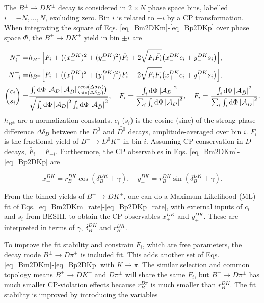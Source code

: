 \documentclass[12pt, a4paper, notitlepage, onecolumn]{article}
\begin{document}
The $B^\pm\to DK^\pm$ decay is considered in $2\times N$ phase space bins, labelled $i = -N, ..., N$, excluding zero. Bin $i$ is related to $-i$ by a CP transformation. When integrating the square of Eqs. \eqref{eq_Bm2DKm}-\eqref{eq_Bp2DKp} over phase space $\Phi$, the $B^\mp\to DK^\mp$ yield in bin $\pm i$ are

\begin{align}
  N^-_i =& h_{B^-}\Big[F_i + \big((x_-^{DK})^2 + (y_-^{DK})^2\big)\bar{F}_i + 2\sqrt{F_i\bar{F}_i}\big(x_-^{DK}c_i + y_-^{DK}s_i\big)\Big], \label{eq_Bm2DKm_rate} \\
  N^+_{-i} =& h_{B^+}\Big[F_i + \big((x_+^{DK})^2 + (y_+^{DK})^2\big)\bar{F}_i + 2\sqrt{F_i\bar{F}_i}\big(x_+^{DK}c_i + y_+^{DK}s_i\big)\Big], \label{eq_Bp2DKp_rate} \\
  {c_i\choose s_i} =& \frac{\int_i\dd{\Phi}\abs{\mathcal{A}_D}\abs{\mathcal{A}_{\bar{D}}}{\cos(\Delta\delta_D)\choose\sin(\Delta\delta_D)}}{\sqrt{\int_i\dd{\Phi}\abs{\mathcal{A}_D}^2\int_i\dd{\Phi}\abs{\mathcal{A}_{\bar{D}}}^2}}, \quad F_i = \frac{\int_i\dd{\Phi}\abs{\mathcal{A}_D}^2}{\sum_i\int_i\dd{\Phi}\abs{\mathcal{A}_D}^2}, \quad \bar{F}_i = \frac{\int_i\dd{\Phi}\abs{\mathcal{A}_{\bar{D}}}^2}{\sum_i\int_i\dd{\Phi}\abs{\mathcal{A}_{\bar{D}}}^2}. \label{eq_hadronic_parameters}
\end{align}
$h_{B^\pm}$ are a normalization constants. $c_i$ ($s_i$) is the cosine (sine) of the strong phase difference $\Delta\delta_D$ between the $D^0$ and $\bar{D^0}$ decays, amplitude-averaged over bin $i$. $F_i$ is the fractional yield of $B^-\to D^0K^-$ in bin $i$. Assuming CP conservation in $D$ decays, $\bar{F}_i = F_{-i}$. Furthermore, the CP observables in Eqs. \eqref{eq_Bm2DKm}-\eqref{eq_Bp2DKp} are

\begin{equation}
  x_\pm^{DK} = r_B^{DK}\cos(\delta_B^{DK}\pm\gamma), \quad  y_\pm^{DK} = r_B^{DK}\sin(\delta_B^{DK}\pm\gamma).
  \label{eq_xy_cp}
\end{equation}

From the binned yields of $B^\pm\to DK^\pm$, one can do a Maximum Likelihood (ML) fit of Eqs. \eqref{eq_Bm2DKm_rate}-\eqref{eq_Bp2DKp_rate}, with external inputs of $c_i$ and $s_i$ from BESIII, to obtain the CP observables $x_\pm^{DK}$ and $y_\pm^{DK}$. These are interpreted in terms of $\gamma$, $\delta_B^{DK}$ and $r_B^{DK}$.

To improve the fit stability and constrain $F_i$, which are free parameters, the decay mode $B^\pm\to D\pi^\pm$ is included fit. This adds another set of Eqs. \eqref{eq_Bm2DKm}-\eqref{eq_Bp2DKp} with $K\to\pi$. The similar selection and common topology means $B^\pm\to DK^\pm$ and $D\pi^\pm$ will share the same $F_i$, but $B^\pm\to D\pi^\pm$ has much smaller CP-violation effects because $r_B^{D\pi}$ is much smaller than $r_B^{DK}$. The fit stability is improved by introducing the variables
\end{document}
